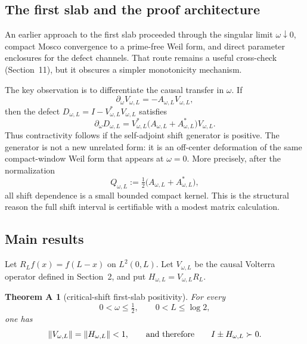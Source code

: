 \documentclass[11pt,a4paper]{article}
\DeclarePairedDelimiter{\norm}{\lVert}{\rVert}
\theoremstyle{plain}
\newtheorem*{thmA}{Theorem A}
\theoremstyle{definition}
\numberwithin{equation}{section}
\begin{document}
\subsection{The first slab and the proof architecture}

An earlier approach to the first slab proceeded through the singular limit
$\omega\downarrow0$, compact Mosco convergence to a prime-free Weil form, and
direct parameter enclosures for the defect channels. That route remains a
useful cross-check (Section~11), but it obscures a simpler monotonicity
mechanism.

The key observation is to differentiate the causal transfer in $\omega$. If
\begin{equation}
\partial_\omega V_{\omega,L}=-A_{\omega,L}V_{\omega,L},
\end{equation}
then the defect $D_{\omega,L}=I-V_{\omega,L}^{*}V_{\omega,L}$ satisfies
\begin{equation}
\partial_\omega D_{\omega,L}
=V_{\omega,L}^{*}\bigl(A_{\omega,L}+A_{\omega,L}^{*}\bigr)V_{\omega,L}.
\end{equation}
Thus contractivity follows if the self-adjoint shift generator is positive.
The generator is not a new unrelated form: it is an off-center deformation of
the same compact-window Weil form that appears at $\omega=0$. More precisely,
after the normalization
\begin{equation}\label{eq:Qdef-intro}
Q_{\omega,L}:=\tfrac12\bigl(A_{\omega,L}+A_{\omega,L}^{*}\bigr),
\end{equation}
all shift dependence is a small bounded compact kernel. This is the structural
reason the full shift interval is certifiable with a modest matrix
calculation.

\subsection{Main results}

Let $R_Lf(x)=f(L-x)$ on $L^2(0,L)$. Let $V_{\omega,L}$ be the causal Volterra
operator defined in Section~2, and put $H_{\omega,L}=V_{\omega,L}R_L$.

\begin{thmA}[critical-shift first-slab positivity]
For every
\[
0<\omega\le\tfrac12,\qquad 0<L\le\log2,
\]
one has
\begin{equation}
\norm{V_{\omega,L}}=\norm{H_{\omega,L}}<1,
\qquad\text{and therefore}\qquad
I\pm H_{\omega,L}\succ0 .
\end{equation}
\end{thmA}
\end{document}
